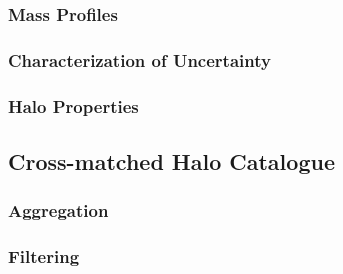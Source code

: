 \subsubsection{Mass Profiles}
\label{subsubsec:mass_profiles}



\subsubsection{Characterization of Uncertainty}
\label{subsubsec:uncertainty}



\subsubsection{Halo Properties}
\label{subsubsec:halo_properties}




\subsection{Cross-matched Halo Catalogue}
\label{subsec:catalogue}



\subsubsection{Aggregation}
\label{subsubsec:aggregation}



\subsubsection{Filtering}
\label{subsubsec:filtering}




